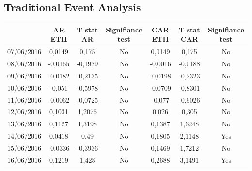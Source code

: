 \documentclass[11pt]{report}
\begin{document}
\subsection*{Traditional Event Analysis}
\begin{table}[!h]
\centering
\begin{tabular}{c|c|c|c|c|c|c|}
\cline{2-7}
                                          & AR ETH          & T-stat AR        & Signifiance test & CAR ETH          & T-stat CAR       & Signifiance test \\ \hline
\multicolumn{1}{|c|}{07/06/2016}          & 0,0149          & 0,175            & No               & 0,0149           & 0,175            & No               \\ \hline
\multicolumn{1}{|c|}{08/06/2016}          & -0,0165         & -0,1939          & No               & -0,0016          & -0,0188          & No               \\ \hline
\multicolumn{1}{|c|}{09/06/2016}          & -0,0182         & -0,2135          & No               & -0,0198          & -0,2323          & No               \\ \hline
\multicolumn{1}{|c|}{10/06/2016}          & -0,051          & -0,5978          & No               & -0,0709          & -0,8301          & No               \\ \hline
\multicolumn{1}{|c|}{11/06/2016}          & -0,0062         & -0,0725          & No               & -0,077           & -0,9026          & No               \\ \hline
\multicolumn{1}{|c|}{12/06/2016}          & 0,1031          & 1,2076           & No               & 0,026            & 0,305            & No               \\ \hline
\multicolumn{1}{|c|}{13/06/2016}          & 0,1127          & 1,3198           & No               & 0,1387           & 1,6248           & No               \\ \hline
\multicolumn{1}{|c|}{14/06/2016}          & 0,0418          & 0,49             & No               & 0,1805           & 2,1148           & Yes              \\ \hline
\multicolumn{1}{|c|}{15/06/2016}          & -0,0336         & -0,3936          & No               & 0,1469           & 1,7212           & No               \\ \hline
\multicolumn{1}{|c|}{16/06/2016}          & 0,1219          & 1,428            & No               & 0,2688           & 3,1491           & Yes              \\ \hline

\end{tabular}
\end{table}
\end{document}
